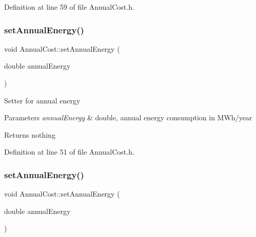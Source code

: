 Definition at line 59 of file Annual\+Cost.\+h.

\mbox{\label{class_annual_cost_a4379cc7b591abefb2302d74c57227357}} 
\subsubsection{\texorpdfstring{set\+Annual\+Energy()}{setAnnualEnergy()}\hspace{0.1cm}{\footnotesize\ttfamily [1/3]}}
{\footnotesize\ttfamily void Annual\+Cost\+::set\+Annual\+Energy (\begin{DoxyParamCaption}\item[{double}]{annual\+Energy }\end{DoxyParamCaption})\hspace{0.3cm}{\ttfamily [inline]}}

Setter for annual energy 
\begin{DoxyParams}{Parameters}
{\em annual\+Energy} & double, annual energy consumption in M\+Wh/year \\
\hline
\end{DoxyParams}
\begin{DoxyReturn}{Returns}
nothing 
\end{DoxyReturn}


Definition at line 51 of file Annual\+Cost.\+h.

\mbox{\label{class_annual_cost_a4379cc7b591abefb2302d74c57227357}} 
\subsubsection{\texorpdfstring{set\+Annual\+Energy()}{setAnnualEnergy()}\hspace{0.1cm}{\footnotesize\ttfamily [2/3]}}
{\footnotesize\ttfamily void Annual\+Cost\+::set\+Annual\+Energy (\begin{DoxyParamCaption}\item[{double}]{annual\+Energy }\end{DoxyParamCaption})\hspace{0.3cm}{\ttfamily [inline]}}


